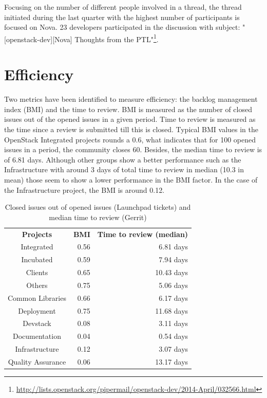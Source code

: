 \documentclass[a4wide,11pt]{report}
\begin{document}
Focusing on the number of different people involved in a thread, the thread initiated during the last quarter
with the highest number of participants is focused on Nova. 23 developers participated in the discussion with subject: "[openstack-dev][Nova] Thoughts from the PTL"\footnote{\url{http://lists.openstack.org/pipermail/openstack-dev/2014-April/032566.html}}. 


\section{Efficiency}






Two metrics have been identified to measure efficiency: the backlog management index (BMI) and the time to review. BMI is measured as the number of closed issues out of the opened issues in a given period. Time to review is measured as the time since a review is submitted till this
is closed. Typical BMI values in the OpenStack Integrated projects rounds a 0.6, what indicates that for 100 opened issues in a period, the community closes 60. Besides, the median time to review is of 6.81 days. Although other groups show a better
performance such as the Infrastructure with around 3 days of total time to review in median (10.3 in mean) those seem to show a lower performance in the BMI factor. In the case of the Infrastructure project, the BMI is around 0.12.


\begin{table}[H]
\centering
\begin{tabular}{c|r|r|} 
\textbf{Projects} & \textbf{BMI} & \textbf{Time to review (median)} \\
Integrated &  0.56 & 6.81 days\\
Incubated & 0.59 & 7.94 days\\
Clients & 0.65 & 10.43 days\\
Others & 0.75 & 5.06 days\\
Common Libraries & 0.66 & 6.17 days\\
Deployment & 0.75 & 11.68 days\\
Devstack & 0.08 & 3.11 days\\
Documentation & 0.04 & 0.54 days\\
Infrastructure & 0.12 & 3.07 days\\
Quality Assurance & 0.06 & 13.17 days\\
\end{tabular}
\caption{Closed issues out of opened issues (Launchpad tickets) and median time to review (Gerrit)}
\end{table}
\end{document}
